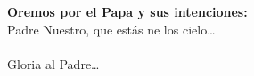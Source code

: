 \textbf{Oremos por el Papa y sus intenciones:}\\
Padre Nuestro, que estás ne los cielo\ldots\\
\\
Gloria al Padre\ldots
